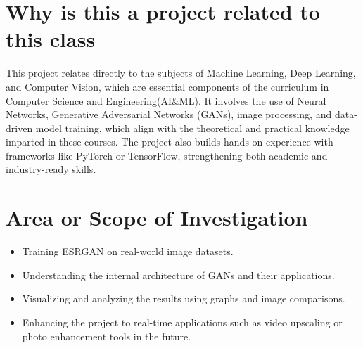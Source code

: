 
\section{Why is this a project related to this class}
This project relates directly to the subjects of Machine Learning, Deep Learning, and Computer Vision, which are essential components of the curriculum in Computer Science and Engineering(AI\&ML). It involves the use of Neural Networks, Generative Adversarial Networks (GANs), image processing, and data-driven model training, which align with the theoretical and practical knowledge imparted in these courses. The project also builds hands-on experience with frameworks like PyTorch or TensorFlow, strengthening both academic and industry-ready skills.

\section{Area or Scope of Investigation}
\begin{itemize}
    
    
    
        \item Training ESRGAN on real-world image datasets.
        \item Understanding the internal architecture of GANs and their applications.
        \item Visualizing and analyzing the results using graphs and image comparisons.
        \item Enhancing the project to real-time applications such as video upscaling or photo enhancement tools in the future.
\end{itemize}
